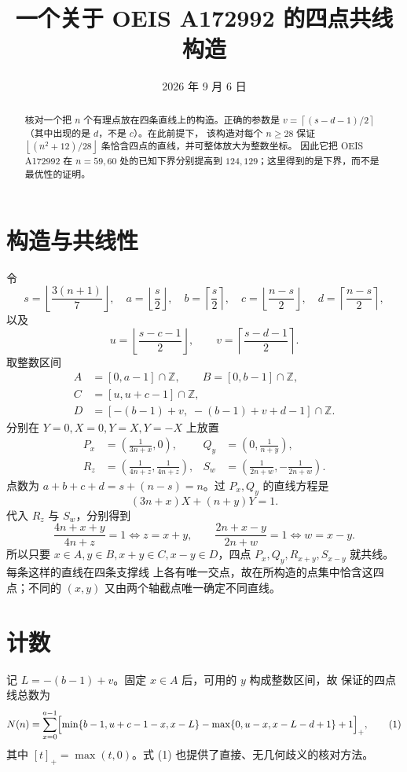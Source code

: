 \documentclass[11pt,a4paper]{ctexart}
\title{一个关于 OEIS A172992 的四点共线构造}
\author{}
\date{2026 年 9 月 6 日}
\newcommand{\floor}[1]{\left\lfloor #1\right\rfloor}
\newcommand{\ceil}[1]{\left\lceil #1\right\rceil}
\newcommand{\Z}{\mathbb Z}
\begin{document}
\maketitle
\vspace{-2.5em}

\begin{abstract}
核对一个把 $n$ 个有理点放在四条直线上的构造。正确的参数是
$v=\ceil{(s-d-1)/2}$（其中出现的是 $d$，不是 $c$）。在此前提下，
该构造对每个 $n\ge 28$ 保证
$\floor{(n^2+12)/28}$ 条恰含四点的直线，并可整体放大为整数坐标。
因此它把 OEIS A172992 在 $n=59,60$ 处的已知下界分别提高到
$124,129$；这里得到的是下界，而不是最优性的证明。
\end{abstract}

\section*{构造与共线性}
令
\[
 s=\floor{\frac{3(n+1)}7},\quad
 a=\floor{\frac s2},\quad b=\ceil{\frac s2},\quad
 c=\floor{\frac{n-s}2},\quad d=\ceil{\frac{n-s}2},
\]
以及
\[
 u=\floor{\frac{s-c-1}{2}},\qquad
 v=\ceil{\frac{s-d-1}{2}}.
\]
取整数区间
\[
\begin{split}
 A&=[0,a-1]\cap\Z,\qquad B=[0,b-1]\cap\Z,\\
 C&=[u,u+c-1]\cap\Z,\\
 D&=[-(b-1)+v,\;-(b-1)+v+d-1]\cap\Z.
\end{split}
\]
分别在 $Y=0,X=0,Y=X,Y=-X$ 上放置
\[
\begin{aligned}
 P_x&=\left(\frac1{3n+x},0\right),&
 Q_y&=\left(0,\frac1{n+y}\right),\\
 R_z&=\left(\frac1{4n+z},\frac1{4n+z}\right),&
 S_w&=\left(\frac1{2n+w},-\frac1{2n+w}\right).
\end{aligned}
\]
点数为 $a+b+c+d=s+(n-s)=n$。过 $P_x,Q_y$ 的直线方程是
\[
 (3n+x)X+(n+y)Y=1.
\]
代入 $R_z$ 与 $S_w$，分别得到
\[
 \frac{4n+x+y}{4n+z}=1\iff z=x+y,
 \qquad
 \frac{2n+x-y}{2n+w}=1\iff w=x-y.
\]
所以只要 $x\in A,y\in B,x+y\in C,x-y\in D$，四点
$P_x,Q_y,R_{x+y},S_{x-y}$ 就共线。每条这样的直线在四条支撑线
上各有唯一交点，故在所构造的点集中恰含这四点；不同的 $(x,y)$
又由两个轴截点唯一确定不同直线。

\section*{计数}
记 $L=-(b-1)+v$。固定 $x\in A$ 后，可用的 $y$ 构成整数区间，故
保证的四点线总数为
\[
 N(n)=\sum_{x=0}^{a-1}
 \Bigl[\min\{b-1,u+c-1-x,x-L\}
 -\max\{0,u-x,x-L-d+1\}+1\Bigr]_+,
 \tag{1}
\]
其中 $[t]_+=\max(t,0)$。式 (1) 也提供了直接、无几何歧义的核对方法。
\end{document}
